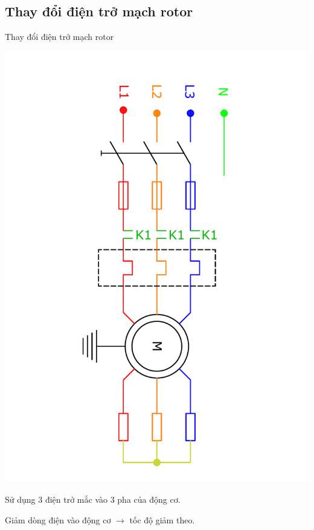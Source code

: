 \documentclass{beamer}
\begin{document}
\subsection{Thay đổi điện trở mạch rotor}
\begin{frame}{Thay đổi điện trở mạch rotor}
	\vspace{-2.5cm}
	\begin{center}
		\includegraphics[scale=0.4, angle = 90]{../sodomach/dieu-chinh-dien-tro-rotor.pdf}
	\end{center}

	\vspace{-2.5cm}
	\begin{list}{--}{}
		\item Sử dụng 3 điện trở mắc vào 3 pha của động cơ.
		\item Giảm dòng điện vào động cơ $\longrightarrow$ tốc độ giảm theo.
	\end{list}
\end{frame}
\end{document}
